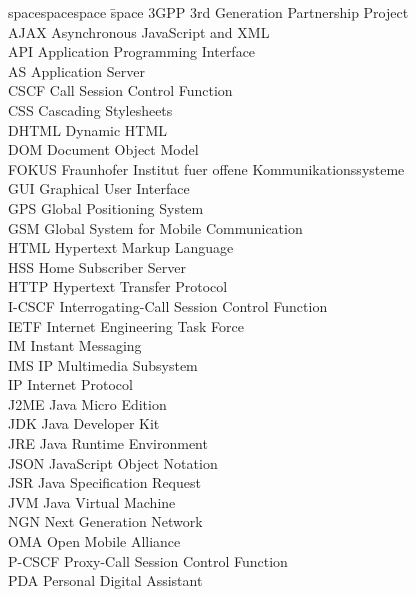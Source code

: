 
\begin{tabbing}
    spacespacespace \= space \kill
    3GPP	 \> 	3rd Generation Partnership Project	 \\
    AJAX	\>	Asynchronous JavaScript and XML \\
    API	 \> 	Application Programming Interface	 \\
    AS	\>	Application Server \\
    CSCF	 \> 	Call Session Control Function	 \\
    CSS	\>	Cascading Stylesheets \\
    DHTML	\>	Dynamic HTML \\
    DOM	\>	Document Object Model \\
    FOKUS	\>	Fraunhofer Institut fuer offene Kommunikationssysteme \\
    GUI	\>	Graphical User Interface \\
    GPS	\>	Global Positioning System \\
    GSM	\>	Global System for Mobile Communication\\
    HTML	\>	Hypertext Markup Language \\
    HSS	 \> 	Home Subscriber Server	 \\
    HTTP	 \> 	Hypertext Transfer Protocol	 \\
    I-CSCF	 \> 	Interrogating-Call Session Control Function	 \\
    IETF	\>	Internet Engineering Task Force \\
    IM	\>	Instant Messaging \\
    IMS	 \> 	IP Multimedia Subsystem	 \\
    IP	 \> 	Internet Protocol	 \\
    J2ME	\>	Java Micro Edition \\
    JDK	\>	Java Developer Kit \\
    JRE	\>	Java Runtime Environment \\
    JSON	\>	JavaScript Object Notation \\
    JSR	\>	Java Specification Request \\
    JVM	 \> 	Java Virtual Machine	 \\
    NGN	 \> 	Next Generation Network	 \\
    OMA	 \> 	Open Mobile Alliance	 \\
    P-CSCF	 \> 	Proxy-Call Session Control Function	 \\
    PDA	\>	Personal Digital Assistant \\

\end{tabbing}
